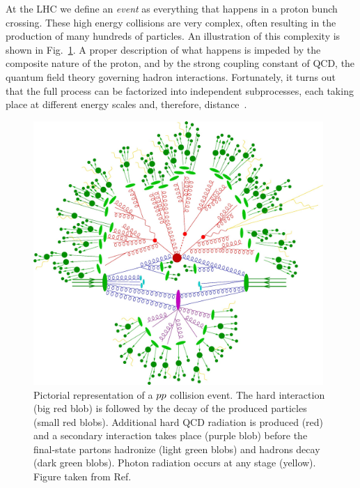 
At the LHC we define an \textit{event} as everything that happens in a proton bunch crossing.
These high energy collisions are very complex, often resulting in the production of many hundreds of
particles. An illustration of this complexity is shown in Fig.~\ref{fig:event_full_event}.
A proper description of what happens is impeded by the composite nature of the proton, and by the
strong coupling constant of QCD, the quantum field theory governing hadron
interactions.
Fortunately, it turns out that the full process can be factorized into independent subprocesses,
each taking place at different energy scales and, therefore, distance~\cite{Skands:2011pf}. 


\begin{figure}[p]
  \centering
  \includegraphics[width=0.98\textwidth]{figures/eventreco_event/full_event}
  \caption{Pictorial representation of a ${p}{p}$ collision event.
The hard interaction (big red blob) is followed by the decay of the produced particles (small red
blobs).
Additional hard QCD radiation is produced (red) and a secondary interaction takes place (purple
blob) before the final-state partons hadronize (light green blobs) and hadrons decay (dark green
blobs). Photon radiation occurs at any stage (yellow). Figure taken from
Ref.~\cite{Gleisberg:2008ta}
  \label{fig:event_full_event}}
\end{figure}


